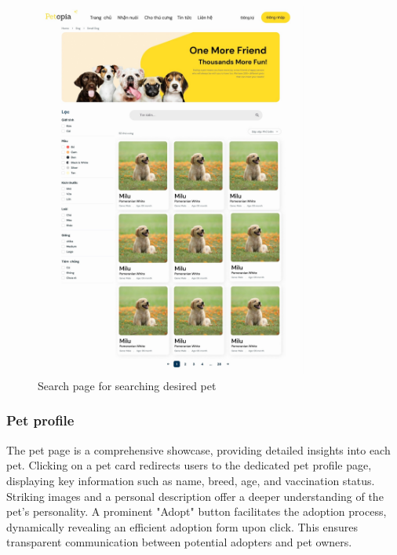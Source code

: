 \begin{figure}[H]
    \centering
    \includegraphics[width=0.8\textwidth]{Figures/search_ui.jpg}
    \caption{Search page for searching desired pet}
\end{figure}


\subsubsection{Pet profile}

The pet page is a comprehensive showcase, providing detailed insights into each pet. Clicking on a pet card redirects users to the dedicated pet profile page, displaying key information such as name, breed, age, and vaccination status. Striking images and a personal description offer a deeper understanding of the pet's personality. A prominent "Adopt" button facilitates the adoption process, dynamically revealing an efficient adoption form upon click. This ensures transparent communication between potential adopters and pet owners.

